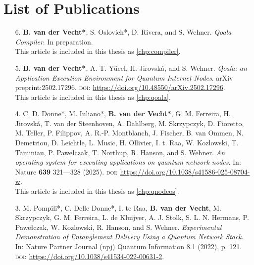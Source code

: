 \chapter*{List of Publications}

\def\aicon{\makebox[1.25em][l]{\footnotesize \faUser}}
\def\ficon{\makebox[1.25em][l]{\footnotesize \faFileTextO}}
\def\picon{\makebox[1.25em][l]{\footnotesize \faPencilSquareO}}

\begin{enumerate}[label={\arabic*.},itemsep=0.7\baselineskip,parsep=0.3\baselineskip]
    \item[6.] \textbf{B. van der Vecht*}, S. Oslovich*, D. Rivera, and S. Wehner. \textit{Qoala Compiler}. In preparation.
        \\ \ficon This article is included in this thesis as \cref{chp:compiler}.

    \item[5.]
        \textbf{B. van der Vecht*}, A. T. Yücel, H. Jirovská, and S. Wehner.
        \textit{Qoala: an Application Execution Environment for Quantum Internet Nodes}.
        arXiv preprint:2502.17296.
        {\small \textsc{doi:}} \url{https://doi.org/10.48550/arXiv.2502.17296}.
        \\ \ficon This article is included in this thesis as \cref{chp:qoala}.

    \item[4.]
        C. D. Donne*, M. Iuliano*, \textbf{B. van der Vecht*}, G. M. Ferreira, H. Jirovská, T. van der Steenhoven, A. Dahlberg, M. Skrzypczyk, D. Fioretto, M. Teller, P. Filippov, A. R.-P. Montblanch, J. Fischer, B. van Ommen, N. Demetriou, D. Leichtle, L. Music, H. Ollivier, I. t. Raa, W. Kozlowski, T. Taminiau, P. Pawełczak, T. Northup, R. Hanson, and S. Wehner.
        \textit{An operating system for executing applications on quantum network nodes}.
        In: Nature \textbf{639} 321---328 (2025).
        {\small \textsc{doi:}} \url{https://doi.org/10.1038/s41586-025-08704-w}.
        \\ \ficon This article is included in this thesis as \cref{chp:qnodeos}.

    \item[3.]
        M. Pompili*, C. Delle Donne*, I. te Raa, \textbf{B. van der Vecht}, M. Skrzypczyk, G. M. Ferreira, L. de Kluijver, A. J. Stolk, S. L. N. Hermans, P. Pawełczak, W. Kozlowski, R. Hanson, and S. Wehner.
        \textit{Experimental Demonstration of Entanglement Delivery Using a Quantum Network Stack}.
        In: Nature Partner Journal (npj) Quantum Information 8.1 (2022), p. 121.
        {\small \textsc{doi:}} \url{https://doi.org/10.1038/s41534-022-00631-2}.


\end{enumerate}
